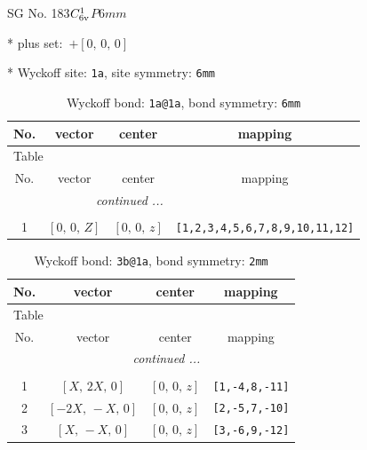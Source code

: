 \documentclass[fleqn,8pt]{jsarticle}
\begin{document}
\setcounter{MaxMatrixCols}{32}

\renewcommand{\tablename}{Table~}
\renewcommand{\figurename}{Figure~}
\begin{center}
\LARGE
SG No. 183\quad$C_{\rm 6v}^{1}$\quad$P6mm$\quad[ hexagonal ]
\end{center}

* plus set:\,\,\,$+\left[ 0,\, 0,\, 0 \right]$


* Wyckoff site: {\tt 1a}, site symmetry: {\tt 6mm}
\renewcommand{\arraystretch}{1.2}
\begin{longtable}{cccc}
\caption{Wyckoff bond: {\tt 1a@1a}, bond symmetry: {\tt 6mm}}
 \\
 \hline \hline
No. & vector & center & mapping \\ \hline \endfirsthead

\multicolumn{3}{l}{\tablename\ \thetable{}} \\
 \hline \hline
No. & vector & center & mapping \\ \hline \endhead

 \hline \hline
\multicolumn{3}{r}{\footnotesize\it continued ...} \\ \endfoot

 \hline \hline
\multicolumn{3}{r}{} \\ \endlastfoot

1 & $\left[ 0,\, 0,\, Z \right]$ & $\left[ 0,\, 0,\, z \right]$ & {\tt [1,2,3,4,5,6,7,8,9,10,11,12]} \\
\end{longtable}
\renewcommand{\arraystretch}{1.2}
\begin{longtable}{cccc}
\caption{Wyckoff bond: {\tt 3b@1a}, bond symmetry: {\tt 2mm}}
 \\
 \hline \hline
No. & vector & center & mapping \\ \hline \endfirsthead

\multicolumn{3}{l}{\tablename\ \thetable{}} \\
 \hline \hline
No. & vector & center & mapping \\ \hline \endhead

 \hline \hline
\multicolumn{3}{r}{\footnotesize\it continued ...} \\ \endfoot

 \hline \hline
\multicolumn{3}{r}{} \\ \endlastfoot

1 & $\left[ X,\, 2 X,\, 0 \right]$ & $\left[ 0,\, 0,\, z \right]$ & {\tt [1,-4,8,-11]} \\ \hline
2 & $\left[ - 2 X,\, - X,\, 0 \right]$ & $\left[ 0,\, 0,\, z \right]$ & {\tt [2,-5,7,-10]} \\ \hline
3 & $\left[ X,\, - X,\, 0 \right]$ & $\left[ 0,\, 0,\, z \right]$ & {\tt [3,-6,9,-12]} \\
\end{longtable}
\end{document}
